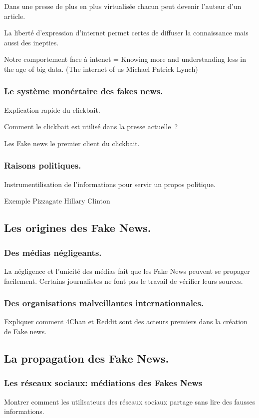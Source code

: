 \documentclass[onecolumn, 12pt]{article}
\begin{document}
    Dans une presse de plus en plus virtualisée chacun peut devenir l'auteur
    d'un article.

    La liberté d'expression d'internet permet certes de diffuser la connaissance
    mais aussi des inepties.

    Notre comportement face à intenet = Knowing more and understanding less in
    the age of big data. (The internet of us Michael Patrick Lynch)

    \subsubsection{Le système monértaire des fakes news.}
    Explication rapide du clickbait.

    Comment le clickbait est utilisé dans la presse actuelle ?

    Les Fake news le premier client du clickbait.

    \subsubsection{Raisons politiques.}
    Instrumentilisation de l'informations pour servir un propos politique.

    Exemple Pizzagate Hillary Clinton

  \subsection{Les origines des Fake News.}
    \subsubsection{Des médias négligeants.}
    La négligence et l'unicité des médias fait que les Fake News peuvent se
    propager facilement. Certains journalistes ne font pas le travail de
    vérifier leurs sources.

    \subsubsection{Des organisations malveillantes internationnales.}
    Expliquer comment 4Chan et Reddit sont des acteurs premiers dans la création
    de Fake news.

  \subsection{La propagation des Fake News.}
    \subsubsection{Les réseaux sociaux: médiations des Fakes News}
    Montrer comment les utilisateurs des réseaux sociaux partage sans lire des
    fausses informations.
\end{document}
